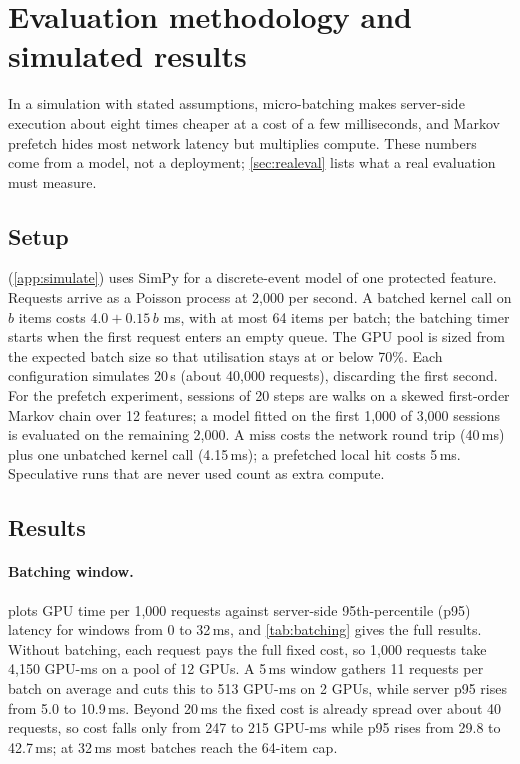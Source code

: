 \section{Evaluation methodology and simulated results}\label{sec:eval}

In a simulation with stated assumptions, micro-batching makes server-side execution about
eight times cheaper at a cost of a few milliseconds, and Markov prefetch hides most network
latency but multiplies compute. These numbers come from a model, not a deployment;
\cref{sec:realeval} lists what a real evaluation must measure.

\subsection{Setup}
 (\cref{app:simulate}) uses SimPy \cite{simpy} for a discrete-event model
of one protected feature. Requests arrive as a Poisson process at 2,000 per second. A
batched kernel call on \(b\) items costs \(4.0 + 0.15\,b\) ms, with at most 64 items per
batch; the batching timer starts when the first request enters an empty queue. The GPU pool
is sized from the expected batch size so that utilisation stays at or below 70\%. Each
configuration simulates 20\,s (about 40,000 requests), discarding the first second. For
the prefetch experiment, sessions of 20 steps are walks on a skewed first-order Markov chain
over 12 features; a model fitted on the first 1,000 of 3,000 sessions is evaluated on the
remaining 2,000. A miss costs the network round trip (40\,ms) plus one unbatched kernel call
(4.15\,ms); a prefetched local hit costs 5\,ms. Speculative runs that are never used count
as extra compute.

\subsection{Results}
\batching
{}\prefetch

\paragraph{Batching window.}  plots GPU time per 1,000 requests against
server-side 95th-percentile (p95) latency for windows from 0 to 32\,ms, and
\cref{tab:batching} gives the full results. Without batching, each request pays the full
fixed cost, so 1,000 requests take 4,150 GPU-ms on a pool of 12 GPUs. A 5\,ms window
gathers 11 requests per batch on average and cuts this to 513 GPU-ms on 2 GPUs, while
server p95 rises from 5.0 to 10.9\,ms. Beyond 20\,ms the fixed cost is already spread over
about 40 requests, so cost falls only from 247 to 215 GPU-ms while p95 rises from 29.8 to
42.7\,ms; at 32\,ms most batches reach the 64-item cap.

